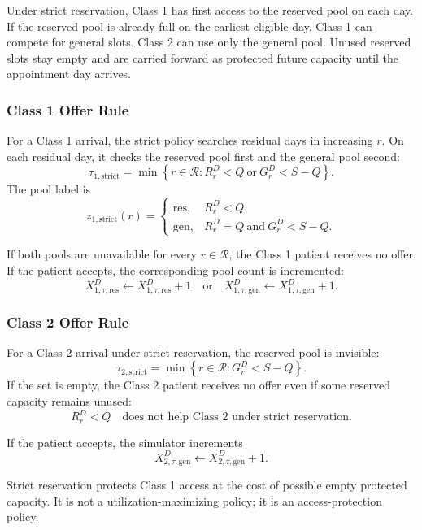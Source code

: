 \documentclass[11pt]{article}
\begin{document}
Under strict reservation, Class 1 has first access to the reserved pool on each day. If the reserved
pool is already full on the earliest eligible day, Class 1 can compete for general slots. Class 2 can
use only the general pool. Unused reserved slots stay empty and are carried forward as protected
future capacity until the appointment day arrives.

\subsubsection{Class 1 Offer Rule}

For a Class 1 arrival, the strict policy searches residual days in increasing \(r\). On each residual
day, it checks the reserved pool first and the general pool second:
\[
\tau_{1,\mathrm{strict}}
=
\min\left\{r\in\mathcal R:R_r^D<Q\ \text{or}\ G_r^D<S-Q\right\}.
\]
The pool label is
\[
z_{1,\mathrm{strict}}(r)
=
\begin{cases}
\mathrm{res}, & R_r^D<Q,\\
\mathrm{gen}, & R_r^D=Q\ \text{and}\ G_r^D<S-Q.
\end{cases}
\]

If both pools are unavailable for every \(r\in\mathcal R\), the Class 1 patient receives no offer.
If the patient accepts, the corresponding pool count is incremented:
\[
X_{1,\tau,\mathrm{res}}^D\leftarrow X_{1,\tau,\mathrm{res}}^D+1
\quad\text{or}\quad
X_{1,\tau,\mathrm{gen}}^D\leftarrow X_{1,\tau,\mathrm{gen}}^D+1.
\]

\subsubsection{Class 2 Offer Rule}

For a Class 2 arrival under strict reservation, the reserved pool is invisible:
\[
\tau_{2,\mathrm{strict}}
=
\min\left\{r\in\mathcal R:G_r^D<S-Q\right\}.
\]
If the set is empty, the Class 2 patient receives no offer even if some reserved capacity remains
unused:
\[
R_r^D<Q
\quad\text{does not help Class 2 under strict reservation.}
\]

If the patient accepts, the simulator increments
\[
X_{2,\tau,\mathrm{gen}}^D
\leftarrow
X_{2,\tau,\mathrm{gen}}^D+1.
\]

\begin{keybox}[title={Strict Reservation Interpretation}]
Strict reservation protects Class 1 access at the cost of possible empty protected capacity. It is
not a utilization-maximizing policy; it is an access-protection policy.
\end{keybox}
\end{document}
